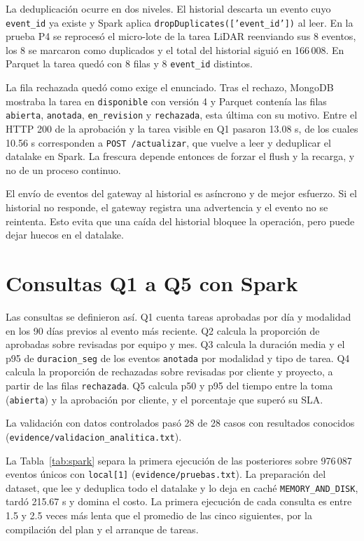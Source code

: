 \documentclass[conference]{IEEEtran}
\begin{document}
La deduplicación ocurre en dos niveles. El historial descarta un evento cuyo \texttt{event\_id} ya existe y Spark aplica \texttt{dropDuplicates(['event\_id'])} al leer. En la prueba P4 se reprocesó el micro-lote de la tarea LiDAR reenviando sus 8 eventos, los 8 se marcaron como duplicados y el total del historial siguió en 166\,008. En Parquet la tarea quedó con 8 filas y 8 \texttt{event\_id} distintos.

La fila rechazada quedó como exige el enunciado. Tras el rechazo, MongoDB mostraba la tarea en \texttt{disponible} con versión 4 y Parquet contenía las filas \texttt{abierta}, \texttt{anotada}, \texttt{en\_revision} y \texttt{rechazada}, esta última con su motivo. Entre el HTTP 200 de la aprobación y la tarea visible en Q1 pasaron 13.08 s, de los cuales 10.56 s corresponden a \texttt{POST /actualizar}, que vuelve a leer y deduplicar el datalake en Spark. La frescura depende entonces de forzar el flush y la recarga, y no de un proceso continuo.

El envío de eventos del gateway al historial es asíncrono y de mejor esfuerzo. Si el historial no responde, el gateway registra una advertencia y el evento no se reintenta. Esto evita que una caída del historial bloquee la operación, pero puede dejar huecos en el datalake.

\section{Consultas Q1 a Q5 con Spark}

Las consultas se definieron así. Q1 cuenta tareas aprobadas por día y modalidad en los 90 días previos al evento más reciente. Q2 calcula la proporción de aprobadas sobre revisadas por equipo y mes. Q3 calcula la duración media y el p95 de \texttt{duracion\_seg} de los eventos \texttt{anotada} por modalidad y tipo de tarea. Q4 calcula la proporción de rechazadas sobre revisadas por cliente y proyecto, a partir de las filas \texttt{rechazada}. Q5 calcula p50 y p95 del tiempo entre la toma (\texttt{abierta}) y la aprobación por cliente, y el porcentaje que superó su SLA.

La validación con datos controlados pasó 28 de 28 casos con resultados conocidos (\texttt{evidence/validacion\_analitica.txt}).

La Tabla~\ref{tab:spark} separa la primera ejecución de las posteriores sobre 976\,087 eventos únicos con \texttt{local[1]} (\texttt{evidence/pruebas.txt}). La preparación del dataset, que lee y deduplica todo el datalake y lo deja en caché \texttt{MEMORY\_AND\_DISK}, tardó 215.67 s y domina el costo. La primera ejecución de cada consulta es entre 1.5 y 2.5 veces más lenta que el promedio de las cinco siguientes, por la compilación del plan y el arranque de tareas.
\end{document}

